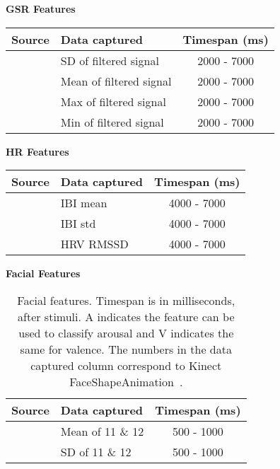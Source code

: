 \begin{table}[H]
    \centering
    {\large \textbf{GSR Features}}\vspace{2pt}
    \begin{tabularx}{\columnwidth}{cXc}
        \toprule
        \textbf{Source} & \textbf{Data captured} & \textbf{Timespan (ms)}\\
        \midrule
        \cite{gsr_len_lat3, gsr_data_processing} & SD of filtered signal & 2000 - 7000\\
        \cite{gsr_len_lat3, gsr_data_processing} & Mean of filtered signal & 2000 - 7000\\
        \cite{gsr_len_lat3, gsr_data_processing} & Max of filtered signal & 2000 - 7000\\
        \cite{gsr_len_lat3, gsr_data_processing} & Min of filtered signal & 2000 - 7000\\
        \bottomrule
    \end{tabularx}
    \label{[TABLE] features gsr}
\end{table}

\begin{table}[H]
    \centering
    {\large \textbf{HR Features}}\vspace{2pt}
    \begin{tabularx}{\columnwidth}{cXc}
        \toprule
        \textbf{Source} & \textbf{Data captured} & \textbf{Timespan (ms)} \\
        \midrule
        \cite{hr_feature1, hrv_source_3} & IBI mean & 4000 - 7000 \\
        \cite{hr_feature1} & IBI std & 4000 - 7000 \\
        \cite{hr_feature1} & HRV RMSSD & 4000 - 7000 \\
        \bottomrule
    \end{tabularx}
    \label{[TABLE] features hr}
\end{table}

\begin{table}[H]
    \centering
    {\large \textbf{Facial Features}}\vspace{2pt}
    \begin{tabularx}{\columnwidth}{cXc}
        \toprule
        \textbf{Source} & \textbf{Data captured} & \textbf{Timespan (ms)} \\
        \midrule
        \cite{scherer_kinect} & Mean of 11 \& 12 & 500 - 1000 \\
        \cite{scherer_kinect} & SD of 11 \& 12 & 500 - 1000 \\
        \bottomrule
    \end{tabularx}
    \caption{Facial features. Timespan is in milliseconds, after stimuli. A indicates the feature can be used to classify arousal and V indicates the same for valence. The numbers in the data captured column correspond to Kinect FaceShapeAnimation~\protect\cite{faceshapes}.}
    \label{[TABLE] features face}
\end{table}


